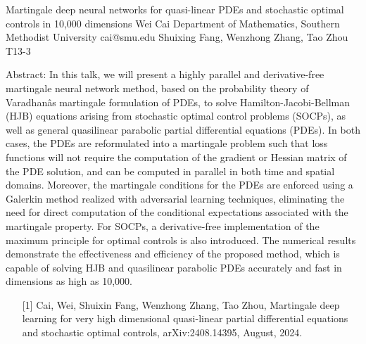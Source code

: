 \begin{talk}
  {Martingale deep neural networks for quasi-linear PDEs and stochastic optimal controls in 10,000 dimensions}%
  {Wei Cai}%
  {Department of Mathematics, Southern Methodist University}%
  {cai@smu.edu}%
  {Shuixing Fang, Wenzhong Zhang, Tao Zhou}%
  {T13-3}%
			
Abstract: In this talk, we will present a highly parallel and derivative-free martingale neural network method, based on the probability theory of Varadhanâs martingale formulation of PDEs, to solve Hamilton-Jacobi-Bellman (HJB) equations arising from stochastic optimal control problems (SOCPs), as well as general quasilinear parabolic partial differential equations (PDEs). In both cases, the PDEs are reformulated into a martingale problem such that loss functions will not require the computation of the gradient or Hessian matrix of the PDE solution, and can be computed in parallel in both time and spatial domains. Moreover, the martingale conditions for the PDEs are enforced using a Galerkin method realized with adversarial learning techniques, eliminating the need for direct computation of the conditional expectations associated with the martingale property. For SOCPs, a derivative-free implementation of the maximum principle for optimal controls is also introduced. The numerical results demonstrate the effectiveness and efficiency of the proposed method, which is capable of solving HJB and quasilinear parabolic PDEs accurately and fast in dimensions as high as 10,000.

\medskip

\begin{enumerate}
	\item[{[1]}] Cai,  Wei, Shuixin Fang, Wenzhong Zhang, Tao Zhou, Martingale deep learning for very high dimensional quasi-linear partial differential equations and stochastic optimal controls,  arXiv:2408.14395, August, 2024. 
\end{enumerate}

 
\end{talk}

